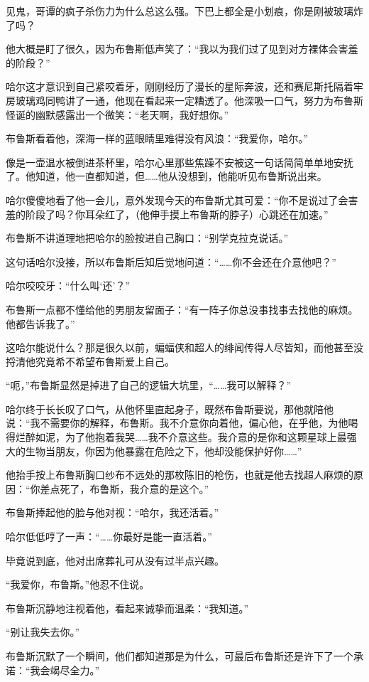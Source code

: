 \documentclass[../main]{subfiles}
\begin{document}
见鬼，哥谭的疯子杀伤力为什么总这么强。下巴上都全是小划痕，你是刚被玻璃炸了吗？

他大概是盯了很久，因为布鲁斯低声笑了：“我以为我们过了见到对方裸体会害羞的阶段？”

哈尔这才意识到自己紧咬着牙，刚刚经历了漫长的星际奔波，还和赛尼斯托隔着牢房玻璃鸡同鸭讲了一通，他现在看起来一定糟透了。他深吸一口气，努力为布鲁斯怪诞的幽默感露出一个微笑：“老天啊，我好想你。”

布鲁斯看着他，深海一样的蓝眼睛里难得没有风浪：“我爱你，哈尔。”

像是一壶温水被倒进茶杯里，哈尔心里那些焦躁不安被这一句话简简单单地安抚了。他知道，他一直都知道，但……他从没想到，他能听见布鲁斯说出来。

哈尔傻傻地看了他一会儿，意外发现今天的布鲁斯尤其可爱：“你不是说过了会害羞的阶段了吗？你耳朵红了，（他伸手摸上布鲁斯的脖子）心跳还在加速。”

布鲁斯不讲道理地把哈尔的脸按进自己胸口：“别学克拉克说话。”

这句话哈尔没接，所以布鲁斯后知后觉地问道：“……你不会还在介意他吧？”

哈尔咬咬牙：“什么叫`还'？”

布鲁斯一点都不懂给他的男朋友留面子：“有一阵子你总没事找事去找他的麻烦。他都告诉我了。”

这哈尔能说什么？那是很久以前，蝙蝠侠和超人的绯闻传得人尽皆知，而他甚至没捋清他究竟希不希望布鲁斯爱上自己。

“呃，”布鲁斯显然是掉进了自己的逻辑大坑里，“……我可以解释？”

哈尔终于长长叹了口气，从他怀里直起身子，既然布鲁斯要说，那他就陪他说：“我不需要你的解释，布鲁斯。我不介意你向着他，偏心他，在乎他，为他喝得烂醉如泥，为了他抱着我哭……我不介意这些。我介意的是你和这颗星球上最强大的生物当朋友，你因为他暴露在危险之下，他却没能保护好你\ldots\ldots”

他抬手按上布鲁斯胸口纱布不远处的那枚陈旧的枪伤，也就是他去找超人麻烦的原因：“你差点死了，布鲁斯，我介意的是这个。”

布鲁斯捧起他的脸与他对视：“哈尔，我还活着。”

哈尔低低哼了一声：“……你最好是能一直活着。”

毕竟说到底，他对出席葬礼可从没有过半点兴趣。

“我爱你，布鲁斯。”他忍不住说。

布鲁斯沉静地注视着他，看起来诚挚而温柔：“我知道。”

“别让我失去你。”

布鲁斯沉默了一个瞬间，他们都知道那是为什么，可最后布鲁斯还是许下了一个承诺：“我会竭尽全力。”
\end{document}
